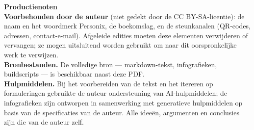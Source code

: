 \clearpage
\thispagestyle{empty}
\begin{flushleft}\small\sffamily
\textbf{Productienoten}\\[1.2em]

\textbf{Voorbehouden door de auteur} (niet gedekt door de CC BY-SA-licentie): de
naam en het woordmerk Personix, de boekomslag, en de steunkanalen (QR-codes,
adressen, contact-e-mail). Afgeleide edities moeten deze elementen verwijderen of
vervangen; ze mogen uitsluitend worden gebruikt om naar dit oorspronkelijke werk
te verwijzen.\\[1.2em]

\textbf{Bronbestanden.} De volledige bron --- markdown-tekst, infografieken,
buildscripts --- is beschikbaar naast deze PDF.\\[1.2em]

\textbf{Hulpmiddelen.} Bij het voorbereiden van de tekst en het itereren op
formuleringen gebruikte de auteur ondersteuning van AI-hulpmiddelen; de
infografieken zijn ontworpen in samenwerking met generatieve hulpmiddelen op
basis van de specificaties van de auteur. Alle ideeën, argumenten en conclusies
zijn die van de auteur zelf.
\end{flushleft}
\clearpage
